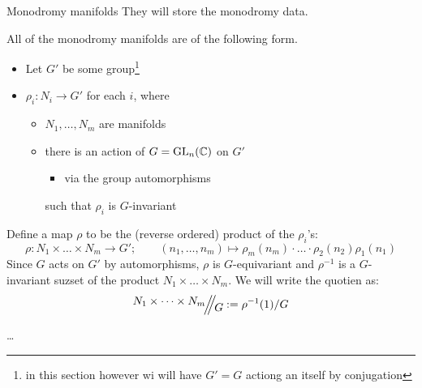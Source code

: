 \begin{frame}{Monodromy manifolds}
  They will store the monodromy data.

  All of the monodromy manifolds are of the following form.
  \begin{itemize}
    \item Let $G'$ be some group\footnote{in this section however wi will have
      $G'=G$ actiong an itself by conjugation}
    \item $\rho_i:N_i\to G'$ for each $i$, where
      \begin{itemize}
        \item $N_1,\dots,N_m$ are manifolds
        \item there is an action of $G=\operatorname{GL}_n(\mathbb{C})$ on $G'$
          \begin{itemize}
            \item via the group automorphisms
          \end{itemize}
          such that $\rho_i$ is $G$-invariant

      \end{itemize}
  \end{itemize}
  Define a map $\rho$ to be the (reverse ordered) product of the $\rho_i$’s:
  \[
    \rho:N_1\times\dots\times N_m\to G'; \qquad (n_1,\dots,n_m)\mapsto
    \rho_m(n_m)\cdot\dots\cdot\rho_2(n_2)\rho_1(n_1)
  \]
  Since $G$ acts on $G'$ by automorphisms, $\rho$ is $G$-equivariant and
  $\rho^{-1}$ is a $G$-invariant suzset of the product
  $N_1\times\dots\times N_m$. We will write the quotien as:
  \[
    \symplquot{N_1\times\dots\times N_m}{G}:=\rho^{-1}(1)/G
  \]
  \begin{defn}[3.1]
    \dots
  \end{defn}
\end{frame}

